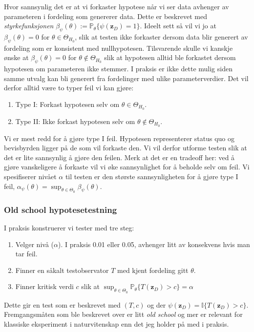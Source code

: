 Hvor sannsynlig det er at vi forkaster hypotese når vi ser data avhenger av parameteren i fordeling som genererer data. Dette er beskrevet med \textit{styrkefunksjonen} $\beta_{\psi}(\theta):=\mathbb{P}_{\theta}\{\psi(\mathbf{z}_D)=1\}$. Ideelt sett så vil vi jo at $\beta_{\psi}(\theta)=0$ for $\theta \in \Theta_{H_0}$, slik at testen ikke forkaster dersom data blir generert av fordeling som er konsistent med nullhypotesen. Tilsvarende skulle vi kanskje ønske at $\beta_{\psi}(\theta)=0$ for $\theta \notin \Theta_{H_0}$ slik at hypotesen alltid ble forkastet dersom hypotesen om parameteren ikke stemmer. I praksis er ikke dette mulig siden samme utvalg kan bli generert fra fordelinger med ulike parameterverdier. Det vil derfor alltid være to typer feil vi kan gjøre:
\begin{enumerate}
\item Type I: Forkast hypotesen selv om $\theta \in \Theta_{H_0}$.
\item Type II: Ikke forkast hypotesen selv om $\theta \notin \Theta_{H_0}$.
\end{enumerate}
Vi er mest redd for å gjøre type I feil. Hypotesen representerer status quo og bevisbyrden ligger på de som vil forkaste den. Vi vil derfor utforme testen slik at det er lite sannsynlig å gjøre den feilen. Merk at det er en tradeoff her: ved å gjøre vanskeligere å forkaste vil vi øke sannsynlighet for å beholde selv om feil. Vi spesifiserer nivået $\alpha$ til testen er den største sannsynligheten for å gjøre type I feil, $\alpha_{\psi}(\theta)=\sup_{\theta \in \Theta_0}\beta_{\psi}(\theta)$.
\subsubsection{Old school hypotesetestning}
I praksis konstruerer vi tester med tre steg:
\begin{enumerate}
\item Velger nivå ($\alpha$). I praksis 0.01 eller 0.05, avhenger litt av konsekvens hvis man tar feil.
\item Finner en såkalt testobservator $T$ med kjent fordeling gitt $\theta$.
\item Finner kritisk verdi $c$ slik at $\sup_{\theta \in \Theta_0} \mathbb{P}_{\theta}\{T(\mathbf{z}_D) > c\}=\alpha$
\end{enumerate}
 Dette gir en test som er beskrevet med $(T,c)$ og der $\psi(\mathbf{z}_D) = \mathbb{I}\{T(\mathbf{z}_D) > c\}$. Fremgangsmåten som ble beskrevet over er litt \textit{old school} og mer er relevant for klassiske eksperiment i naturvitenskap enn det jeg holder på med i praksis. 

